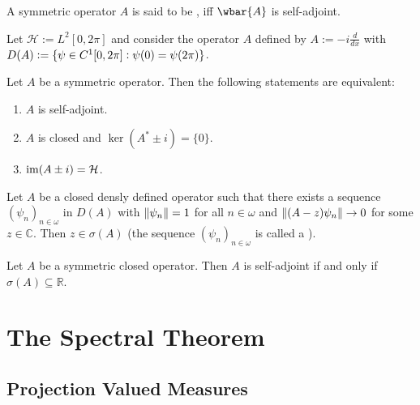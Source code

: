 \begin{definition}
	A symmetric operator $A$ is said to be , iff $\wbar{A}$ is self-adjoint.
\end{definition}

\begin{example}
	Let $\mathcal{H} := L^2[0,2\pi]$ and consider the operator $A$ defined by $A := -i\frac{d}{dx}$ with $D(A) := \cbr[0]{\psi \in C^1[0,2\pi] : \psi(0) = \psi(2\pi)}$.
\end{example}

\begin{theorem}
	Let $A$ be a symmetric operator. Then the following statements are equivalent:
	\begin{enumerate}[label = \textup{(}\alph*\textup{)},wide = 0pt]
		\item $A$ is self-adjoint.
		\item $A$ is closed and $\ker(A^* \pm i) = \{0\}$.
		\item $\operatorname{im}(A \pm i) = \mathcal{H}$.
	\end{enumerate}
\end{theorem}

\begin{lemma}
	Let $A$ be a closed densly defined operator such that there exists a sequence $(\psi_n)_{n \in \omega}$ in $D(A)$ with $\norm[0]{\psi_n} = 1$ for all $n \in \omega$ and $\norm[0]{(A - z)\psi_n} \to 0$ for some $z \in \mathbb{C}$. Then $z \in \sigma(A)$ (the sequence $(\psi_n)_{n \in \omega}$ is called a ).
\end{lemma}

\begin{theorem}
	Let $A$ be a symmetric closed operator. Then $A$ is self-adjoint if and only if $\sigma(A) \subseteq \mathbb{R}$.
\end{theorem}

\section*{The Spectral Theorem}
\subsection*{Projection Valued Measures}

